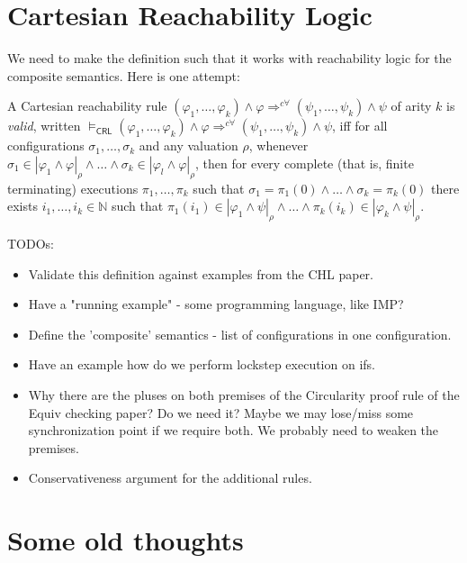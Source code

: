 \documentclass{article}
\newcommand{\CRL}{\mathsf{CRL}}
\begin{document}
\section{Cartesian Reachability Logic}

We need to make the definition such that it works with reachability logic for the composite semantics.
Here is one attempt:
\begin{definition}\label{def:CRLsemantics}
A Cartesian reachability rule
$(\varphi_1,\ldots,\varphi_k) \land \varphi \Rightarrow^{c\forall} (\psi_1,\ldots,\psi_k) \land \psi$
of arity $k$
is \emph{valid},
written
$\vDash_\CRL (\varphi_1,\ldots,\varphi_k) \land \varphi \Rightarrow^{c\forall}
(\psi_1,\ldots,\psi_k) \land \psi$,
iff for all configurations $\sigma_1,\ldots,\sigma_k$ and any valuation $\rho$,
whenever $\sigma_1 \in |\varphi_1 \land \varphi|_\rho \land \ldots \land \sigma_k \in |\varphi_l \land \varphi|_\rho$,
then for every complete (that is, finite terminating) executions $\pi_1, \ldots, \pi_k$ such that
$\sigma_1 = \pi_1(0) \land \ldots \land \sigma_k = \pi_k(0)$ there exists $i_1,\ldots,i_k \in \mathbb{N}$
such that
$\pi_1(i_1) \in |\varphi_1 \land \psi|_\rho \land \ldots \land \pi_k(i_k) \in |\varphi_k \land \psi|_\rho$.
\end{definition}

TODOs:
\begin{itemize}
    \item Validate this definition against examples from the CHL paper.
    \item Have a "running example" - some programming language, like IMP?
    \item Define the 'composite' semantics - list of configurations in one configuration.
    \item Have an example how do we perform lockstep execution on ifs.
    \item Why there are the pluses on both premises of the Circularity proof rule of the Equiv checking paper? Do we need it? Maybe we may lose/miss some synchronization point if we require both. We probably need to weaken the premises.
    \item Conservativeness argument for the additional rules.
\end{itemize}




\appendix

\section{Some old thoughts}
\end{document}
